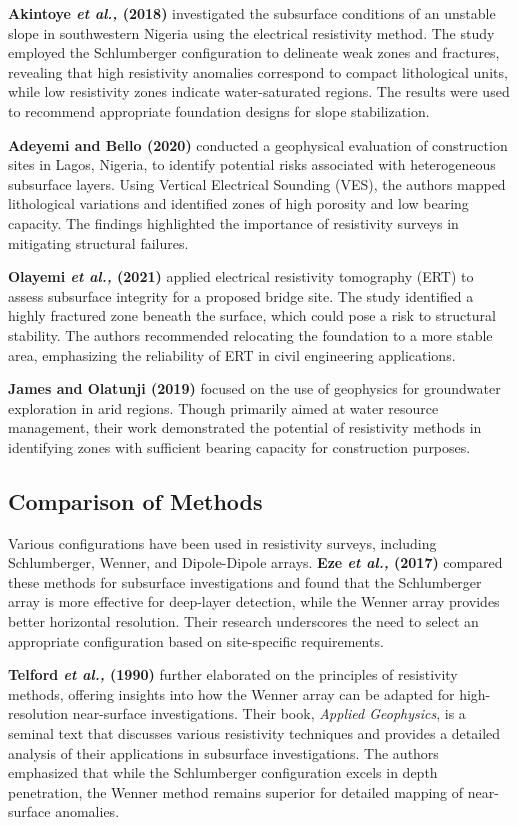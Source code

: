 \documentclass[12pt,a4paper]{report}
\begin{document}
\textbf{Akintoye \textit{et al.,} (2018)} investigated the subsurface conditions of an unstable slope in southwestern Nigeria using the electrical resistivity method. The study employed the Schlumberger configuration to delineate weak zones and fractures, revealing that high resistivity anomalies correspond to compact lithological units, while low resistivity zones indicate water-saturated regions. The results were used to recommend appropriate foundation designs for slope stabilization.

\textbf{Adeyemi and Bello (2020)} conducted a geophysical evaluation of construction sites in Lagos, Nigeria, to identify potential risks associated with heterogeneous subsurface layers. Using Vertical Electrical Sounding (VES), the authors mapped lithological variations and identified zones of high porosity and low bearing capacity. The findings highlighted the importance of resistivity surveys in mitigating structural failures.

\textbf{Olayemi \textit{et al.,} (2021)} applied electrical resistivity tomography (ERT) to assess subsurface integrity for a proposed bridge site. The study identified a highly fractured zone beneath the surface, which could pose a risk to structural stability. The authors recommended relocating the foundation to a more stable area, emphasizing the reliability of ERT in civil engineering applications.

\textbf{James and Olatunji (2019)} focused on the use of geophysics for groundwater exploration in arid regions. Though primarily aimed at water resource management, their work demonstrated the potential of resistivity methods in identifying zones with sufficient bearing capacity for construction purposes.

\subsection{Comparison of Methods}
Various configurations have been used in resistivity surveys, including Schlumberger, Wenner, and Dipole-Dipole arrays. \textbf{Eze \textit{et al.,} (2017)} compared these methods for subsurface investigations and found that the Schlumberger array is more effective for deep-layer detection, while the Wenner array provides better horizontal resolution. Their research underscores the need to select an appropriate configuration based on site-specific requirements.

\textbf{Telford \textit{et al.,} (1990)} further elaborated on the principles of resistivity methods, offering insights into how the Wenner array can be adapted for high-resolution near-surface investigations. Their book, \textit{Applied Geophysics}, is a seminal text that discusses various resistivity techniques and provides a detailed analysis of their applications in subsurface investigations. The authors emphasized that while the Schlumberger configuration excels in depth penetration, the Wenner method remains superior for detailed mapping of near-surface anomalies.
\end{document}
